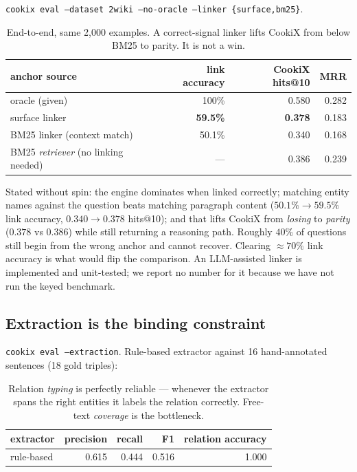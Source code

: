 \documentclass[11pt]{article}
\theoremstyle{definition}
\newcommand{\cmd}[1]{\texttt{\small #1}}
\begin{document}
\cmd{cookix eval --dataset 2wiki --no-oracle --linker \{surface,bm25\}}.

\begin{table}[h]
\centering
\begin{tabular}{lrrr}
\toprule
anchor source & link accuracy & CookiX hits@10 & MRR \\
\midrule
oracle (given)              & 100\% & 0.580 & 0.282 \\
surface linker              & \textbf{59.5\%} & \textbf{0.378} & 0.183 \\
BM25 linker (context match) & 50.1\% & 0.340 & 0.168 \\
\midrule
BM25 \emph{retriever} (no linking needed) & --- & 0.386 & 0.239 \\
\bottomrule
\end{tabular}
\caption{End-to-end, same 2{,}000 examples. A correct-signal linker lifts CookiX from
below BM25 to parity. It is not a win.}
\end{table}

Stated without spin: the engine dominates when linked correctly; matching entity names
against the question beats matching paragraph content ($50.1\%\to59.5\%$ link accuracy,
$0.340\to0.378$ hits@10); and that lifts CookiX from \emph{losing} to \emph{parity}
($0.378$ vs $0.386$) while still returning a reasoning path. Roughly $40\%$ of questions
still begin from the wrong anchor and cannot recover. Clearing $\approx70\%$ link
accuracy is what would flip the comparison. An LLM-assisted linker is implemented and
unit-tested; we report no number for it because we have not run the keyed benchmark.

\subsection{Extraction is the binding constraint}
\label{sec:extraction}

\cmd{cookix eval --extraction}. Rule-based extractor against 16 hand-annotated sentences
(18 gold triples):

\begin{table}[h]
\centering
\begin{tabular}{lrrrr}
\toprule
extractor & precision & recall & F1 & relation accuracy \\
\midrule
rule-based & 0.615 & 0.444 & 0.516 & 1.000 \\
\bottomrule
\end{tabular}
\caption{Relation \emph{typing} is perfectly reliable --- whenever the extractor spans
the right entities it labels the relation correctly. Free-text \emph{coverage} is the
bottleneck.}
\end{table}
\end{document}
